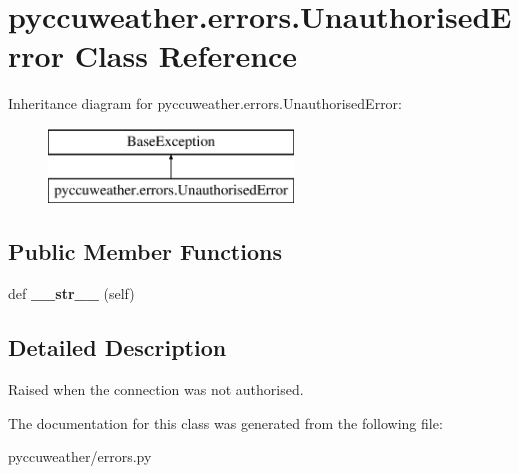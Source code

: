 \hypertarget{classpyccuweather_1_1errors_1_1_unauthorised_error}{}\section{pyccuweather.\+errors.\+Unauthorised\+Error Class Reference}
\label{classpyccuweather_1_1errors_1_1_unauthorised_error}
Inheritance diagram for pyccuweather.\+errors.\+Unauthorised\+Error\+:\begin{figure}[H]
\begin{center}
\leavevmode
\includegraphics[height=2.000000cm]{classpyccuweather_1_1errors_1_1_unauthorised_error}
\end{center}
\end{figure}
\subsection*{Public Member Functions}
\begin{DoxyCompactItemize}
\item 
\hypertarget{classpyccuweather_1_1errors_1_1_unauthorised_error_af25f3990dca22987a786bfd85ad49404}{}def {\bfseries \+\_\+\+\_\+str\+\_\+\+\_\+} (self)\label{classpyccuweather_1_1errors_1_1_unauthorised_error_af25f3990dca22987a786bfd85ad49404}

\end{DoxyCompactItemize}


\subsection{Detailed Description}
\begin{DoxyVerb}Raised when the connection was not authorised.
\end{DoxyVerb}
 

The documentation for this class was generated from the following file\+:\begin{DoxyCompactItemize}
\item 
pyccuweather/errors.\+py\end{DoxyCompactItemize}
